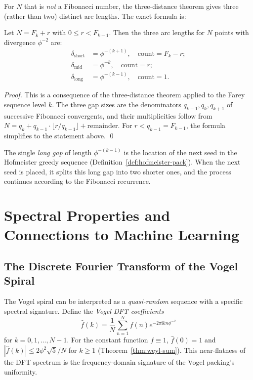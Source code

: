 For $N$ that is \emph{not} a Fibonacci number, the three-distance
theorem gives three (rather than two) distinct arc lengths.  The exact
formula is:

\begin{proposition}
\label{prop:three-gaps}
Let $N = F_{k} + r$ with $0 \leq r < F_{k-1}$.  Then the three arc
lengths for $N$ points with divergence $\phi^{-2}$ are:
\begin{align*}
  \delta_{\mathrm{short}} &= \phi^{-(k+1)}, \quad
    \text{count} = F_{k} - r; \\
  \delta_{\mathrm{mid}}   &= \phi^{-k}, \quad
    \text{count} = r; \\
  \delta_{\mathrm{long}}  &= \phi^{-(k-1)}, \quad
    \text{count} = 1.
\end{align*}
\end{proposition}

\begin{proof}
This is a consequence of the three-distance theorem applied to the
Farey sequence level $k$.  The three gap sizes are the denominators
$q_{k-1}, q_k, q_{k+1}$ of successive Fibonacci convergents, and
their multiplicities follow from $N = q_k + q_{k-1} \cdot \lfloor r/q_{k-1} \rfloor
+ \text{remainder}$.  For $r < q_{k-1} = F_{k-1}$, the formula
simplifies to the statement above.
\qed
\end{proof}

The single \emph{long gap} of length $\phi^{-(k-1)}$ is the location
of the next seed in the Hofmeister greedy sequence (Definition~\ref{def:hofmeister-pack}).
When the next seed is placed, it splits this long gap into two shorter
ones, and the process continues according to the Fibonacci recurrence.

\section{Spectral Properties and Connections to Machine Learning}
\label{sec:spectral-ml}

\subsection{The Discrete Fourier Transform of the Vogel Spiral}
\label{subsec:dft-vogel}

The Vogel spiral can be interpreted as a \emph{quasi-random} sequence
with a specific spectral signature.  Define the \emph{Vogel DFT
coefficients}
\[
  \hat{f}(k) = \frac{1}{N}\sum_{n=1}^{N} f(n) e^{-2\pi\mathrm{i} kn\phi^{-2}}
\]
for $k = 0, 1, \ldots, N-1$.  For the constant function $f \equiv 1$,
$\hat{f}(0) = 1$ and $|\hat{f}(k)| \leq 2\phi^2\sqrt{5}/N$ for $k \geq 1$
(Theorem~\ref{thm:weyl-sum}).  This near-flatness of the DFT spectrum
is the frequency-domain signature of the Vogel packing's uniformity.

